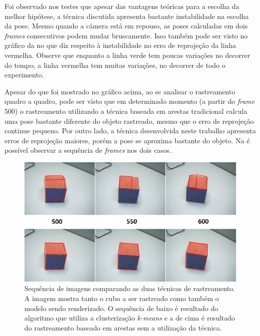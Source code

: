 Foi observado nos testes que apesar das vantagens teóricas para a escolha da melhor hipótese, a técnica discutida apresenta bastante instabilidade na escolha da pose. Mesmo quando a câmera está em repouso, as poses calculadas em dois \emph{frames} consecutivos podem mudar bruscamente. Isso também pode ser visto no gráfico da  no que diz respeito à instabilidade no erro de reprojeção da linha vermelha. Observe que enquanto a linha verde tem poucas variações no decorrer do tempo, a linha vermelha tem muitas variações, no decorrer de todo o experimento.

Apesar do que foi mostrado no gráfico acima, ao se analisar o rastreamento quadro a quadro, pode ser visto que em determinado momento (a partir do \emph{frame} 500) o rastreamento utilizando a técnica baseada em arestas tradicional calcula uma pose bastante diferente do objeto rastreado, mesmo que o erro de reprojeção continue pequeno. Por outro lado, a técnica desenvolvida neste trabalho apresenta erros de reprojeção maiores, porém a pose se aproxima bastante do objeto. Na  é possível observar a sequência de \emph{frames} nos dois casos.

\begin{figure}[!t]
\centering\includegraphics[width=\textwidth]{monografia/sequencia_cubo_real}
\caption{Sequência de imagens comparando as duas técnicas de rastreamento. A imagem mostra tanto o cubo a ser rastreado como também o modelo sendo renderizado. O sequência de baixo é resultado do algoritmo que utiliza a clusterização \emph{k-means} e a de cima é resultado do rastreamento baseado em arestas sem a utilização da técnica.}
\label{sequencia_cubo_real}
\end{figure}

